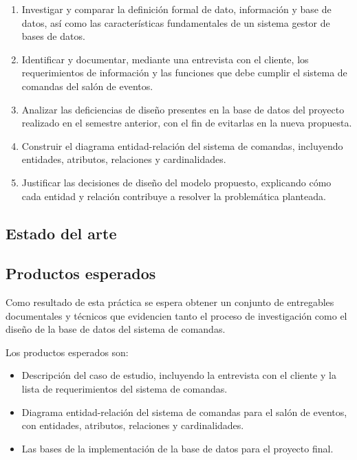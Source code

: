 \begin{enumerate}[label=\arabic*.]
    \item Investigar y comparar la definición formal de dato, información y base de datos, así como las características fundamentales de un sistema gestor de bases de datos.
    \item Identificar y documentar, mediante una entrevista con el cliente, los requerimientos de información y las funciones que debe cumplir el sistema de comandas del salón de eventos.
    \item Analizar las deficiencias de diseño presentes en la base de datos del proyecto realizado en el semestre anterior, con el fin de evitarlas en la nueva propuesta.
    \item Construir el diagrama entidad-relación del sistema de comandas, incluyendo entidades, atributos, relaciones y cardinalidades.
    \item Justificar las decisiones de diseño del modelo propuesto, explicando cómo cada entidad y relación contribuye a resolver la problemática planteada.
\end{enumerate}


\subsection{Estado del arte}



\subsection{Productos esperados}

Como resultado de esta práctica se espera obtener un conjunto de entregables documentales y técnicos que evidencien tanto el proceso de investigación como el diseño de la base de datos del sistema de comandas.

Los productos esperados son:
\begin{itemize}[noitemsep]
     \item Descripción del caso de estudio, incluyendo la entrevista con el cliente y la lista de requerimientos del sistema de comandas.
    \item Diagrama entidad-relación del sistema de comandas para el salón de eventos, con entidades, atributos, relaciones y cardinalidades.
    \item Las bases de la implementación de la base de datos para el proyecto final.
\end{itemize}